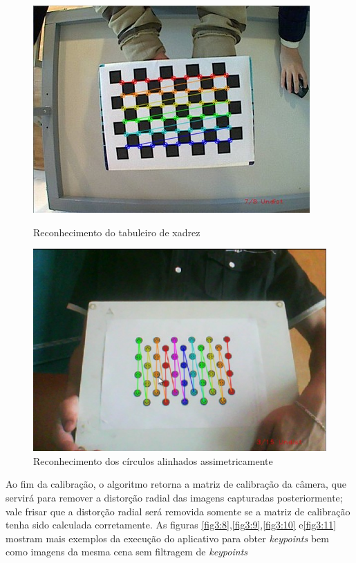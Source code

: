 \begin{figure}[H]
  \includegraphics[width=\linewidth]{Imagens/figura3-6.jpg}
  \caption{Reconhecimento do tabuleiro de xadrez}\label{fig3:6}
\endminipage\hfill
{}
  \includegraphics[width=\linewidth]{Imagens/figura3-7.jpg}
  \caption{Reconhecimento dos círculos alinhados assimetricamente}\label{fig3:7}
\endminipage
\end{figure}

Ao fim da calibração, o algoritmo retorna a matriz de calibração da câmera, que servirá para remover a distorção radial das imagens capturadas posteriormente; vale frisar que a distorção radial será removida somente se  a matriz de calibração tenha sido calculada corretamente. As figuras \ref{fig3:8},\ref{fig3:9},\ref{fig3:10} e\ref{fig3:11} mostram mais exemplos da execução do aplicativo para obter \textit{keypoints} bem como imagens da mesma cena sem filtragem de \textit{keypoints}

